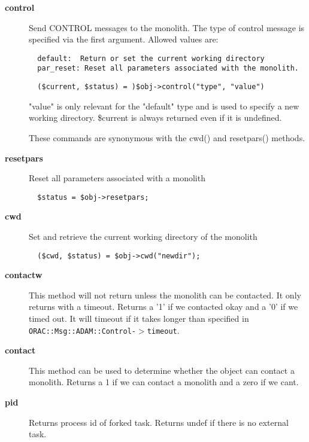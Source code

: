 \begin{description}
\item[\textbf{control}] \mbox{}

Send CONTROL messages to the monolith. The type of control
message is specified via the first argument. Allowed values are:

\begin{verbatim}
  default:  Return or set the current working directory
  par_reset: Reset all parameters associated with the monolith.
\end{verbatim}
\begin{verbatim}
  ($current, $status) = )$obj->control("type", "value")
\end{verbatim}


"value" is only relevant for the "default" type and is used
to specify a new working directory. \$current is always returned
even if it is undefined.



These commands are synonymous with the cwd() and resetpars()
methods.


\item[\textbf{resetpars}] \mbox{}

Reset all parameters associated with a monolith

\begin{verbatim}
  $status = $obj->resetpars;
\end{verbatim}

\item[\textbf{cwd}] \mbox{}

Set and retrieve the current working directory of the monolith

\begin{verbatim}
  ($cwd, $status) = $obj->cwd("newdir");
\end{verbatim}

\item[\textbf{contactw}] \mbox{}

This method will not return unless the monolith can be contacted.
It only returns with a timeout. Returns a '1' if we contacted okay
and a '0' if we timed out. It will timeout if it takes longer than
specified in \texttt{ORAC::Msg::ADAM::Control-$>$timeout}.


\item[\textbf{contact}] \mbox{}

This method can be used to determine whether the object can
contact a monolith. Returns a 1 if we can contact a monolith and
a zero if we cant.


\item[\textbf{pid}] \mbox{}

Returns process id of forked task.
Returns undef if there is no external task.

\end{description}
